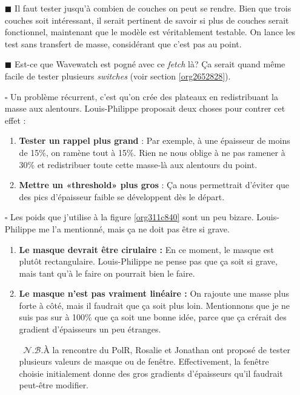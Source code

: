 \documentclass[10pt]{article}
\numberwithin{equation}{section}
\renewcommand{\boxtimes}{\blacksquare}
\newcommand{\nb}{\raisebox{0.8pt}{\scriptsize\textleaf}\ $\mathscr{N. B.}$\hspace{4pt}}
\begin{document}
\begin{itemize}
\item[{$\boxtimes$}] Il faut tester jusqu'à combien de couches on peut se rendre.
Bien que trois couches soit intéressant, il serait pertinent de savoir si plus de couches serait fonctionnel, maintenant que le modèle est véritablement testable.
On lance les test sans transfert de masse, considérant que c'est pas au point.\bigskip

\item[{$\boxtimes$}] Est-ce que Wavewatch est pogné avec ce \emph{fetch} là? Ça serait quand même facile de tester plusieurs \emph{switches} (voir section \ref{org2652828}). \bigskip

\item[{$\square$}] Un problème récurrent, c'est qu'on crée des plateaux en redistribuant la masse aux alentours.
Louis-Philippe proposait deux choses pour contrer cet effet :
\begin{enumerate}
\item \textbf{Tester un rappel plus grand} : Par exemple, à une épaisseur de moins de 15\%, on ramène tout à 15\%.
Rien ne nous oblige à ne pas ramener à 30\% et redistribuer toute cette masse-là aux alentours du point.
\item \textbf{Mettre un «threshold» plus gros} : Ça nous permettrait d'éviter que des pics d'épaisseur faible se développent dès le départ.\bigskip
\end{enumerate}

\item[{$\square$}] Les poids que j'utilise à la figure \ref{org311c840} sont un peu bizare.
Louis-Philippe me l'a mentionné, mais ça ne doit pas être si grave. 
\begin{enumerate}
\item \textbf{Le masque devrait être cirulaire :}
En ce moment, le masque est plutôt rectangulaire.
Louis-Philippe ne pense pas que ça soit si grave, mais tant qu'à le faire on pourrait bien le faire.
\item \textbf{Le masque n'est pas vraiment linéaire :} On rajoute une masse plus forte à côté, mais il faudrait que ça soit plus loin.
Mentionnons que je ne suis pas sur à 100\% que ça soit une bonne idée, parce que ça crérait des gradient d'épaisseurs un peu étranges.\bigskip

\nb À la rencontre du PolR, Rosalie et Jonathan ont proposé de tester plusieurs valeurs de masque ou de fenêtre.
Effectivement, la fenêtre choisie initialement donne des gros gradients d'épaisseurs qu'il faudrait peut-être modifier.\bigskip
\end{enumerate}


\end{itemize}
\end{document}
